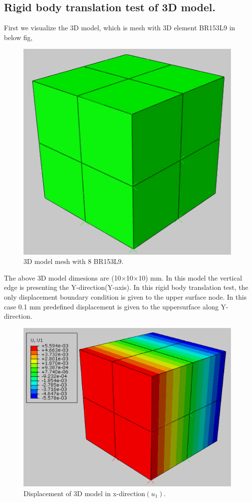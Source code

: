 \documentclass[12pt]{article}
\begin{document}
\subsection{Rigid body translation test of 3D model.}
First we visualize the 3D model, which is mesh with 3D element BR153L9 in below fig,
\begin{figure}[H]
	\begin{center}
		\includegraphics[scale=0.9]{3d_model_8_element_crop.png}  
	\end{center}  
	\caption{3D model mesh with 8 BR153L9.}
\end{figure}
The above 3D model dimesions are (10$ \times $10$ \times $10) mm. In this model the vertical edge is presenting the Y-direction(Y-axis). In this rigid body translation test, the only displacement boundary condition is given to the upper surface node. In this case 0.1 mm predefined displacement is given to the uppersurface along Y-direction.
\begin{figure}[H]
	\begin{center}
		\includegraphics[scale=1.1]{3d_model_U1_crop.png}  
	\end{center}  
	\caption{Displacement of 3D model in x-direction$(u_1)$.}
\end{figure}
\end{document}
